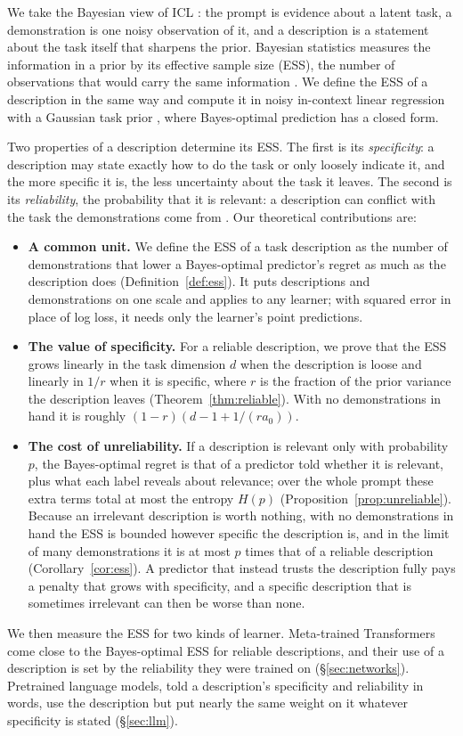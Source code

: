 \documentclass{article}
\begin{document}
We take the Bayesian view of ICL \citep{xie2022}: the prompt is evidence about a latent task, a demonstration is one noisy observation of it, and a description is a statement about the task itself that sharpens the prior. Bayesian statistics measures the information in a prior by its effective sample size (ESS), the number of observations that would carry the same information \citep{morita2008}. We define the ESS of a description in the same way and compute it in noisy in-context linear regression with a Gaussian task prior \citep{garg2022, akyurek2023, raventos2023}, where Bayes-optimal prediction has a closed form.

Two properties of a description determine its ESS. The first is its \emph{specificity}: a description may state exactly how to do the task or only loosely indicate it, and the more specific it is, the less uncertainty about the task it leaves. The second is its \emph{reliability}, the probability that it is relevant: a description can conflict with the task the demonstrations come from \citep{evans2006}. Our theoretical contributions are:
\begin{itemize}
    \item \textbf{A common unit.} We define the ESS of a task description as the number of demonstrations that lower a Bayes-optimal predictor's regret as much as the description does (Definition~\ref{def:ess}). It puts descriptions and demonstrations on one scale and applies to any learner; with squared error in place of log loss, it needs only the learner's point predictions.
    \item \textbf{The value of specificity.} For a reliable description, we prove that the ESS grows linearly in the task dimension $d$ when the description is loose and linearly in $1/r$ when it is specific, where $r$ is the fraction of the prior variance the description leaves (Theorem~\ref{thm:reliable}). With no demonstrations in hand it is roughly $(1-r)(d - 1 + 1/(r a_0))$.
    \item \textbf{The cost of unreliability.} If a description is relevant only with probability $p$, the Bayes-optimal regret is that of a predictor told whether it is relevant, plus what each label reveals about relevance; over the whole prompt these extra terms total at most the entropy $H(p)$ (Proposition~\ref{prop:unreliable}). Because an irrelevant description is worth nothing, with no demonstrations in hand the ESS is bounded however specific the description is, and in the limit of many demonstrations it is at most $p$ times that of a reliable description (Corollary~\ref{cor:ess}). A predictor that instead trusts the description fully pays a penalty that grows with specificity, and a specific description that is sometimes irrelevant can then be worse than none.
\end{itemize}
We then measure the ESS for two kinds of learner. Meta-trained Transformers come close to the Bayes-optimal ESS for reliable descriptions, and their use of a description is set by the reliability they were trained on (\S\ref{sec:networks}). Pretrained language models, told a description's specificity and reliability in words, use the description but put nearly the same weight on it whatever specificity is stated (\S\ref{sec:llm}).
\end{document}
